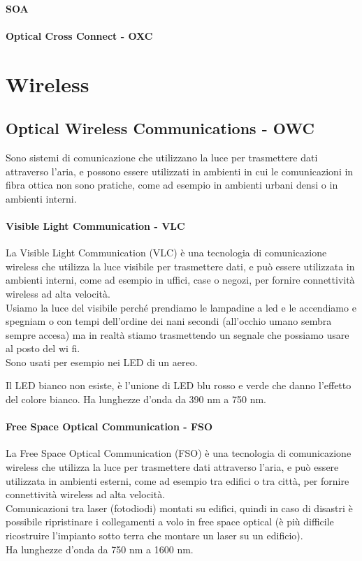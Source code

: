 \paragraph{SOA}

\paragraph{Optical Cross Connect - OXC}

\section{Wireless}
\subsection{Optical Wireless Communications - OWC}
Sono sistemi di comunicazione che utilizzano la luce per trasmettere dati attraverso l'aria, e possono essere utilizzati in ambienti in cui le comunicazioni in fibra ottica non sono pratiche, come ad esempio in ambienti urbani densi o in ambienti interni.\\

\paragraph{Visible Light Communication - VLC}
La Visible Light Communication (VLC) è una tecnologia di comunicazione wireless che utilizza la luce visibile per trasmettere dati, e può essere utilizzata in ambienti interni, come ad esempio in uffici, case o negozi, per fornire connettività wireless ad alta velocità.\\
Usiamo la luce del visibile perché prendiamo le lampadine a led e le accendiamo e spegniam o con tempi dell'ordine dei nani secondi (all'occhio umano sembra sempre accesa) ma in realtà stiamo trasmettendo un segnale che possiamo usare al posto del wi fi.\\
Sono usati per esempio nei LED di un aereo. 

Il LED bianco non esiste, è l'unione di LED blu rosso e verde che danno l'effetto del colore bianco.
Ha lunghezze d'onda da 390 nm a 750 nm.
\paragraph{Free Space Optical Communication - FSO}
La Free Space Optical Communication (FSO) è una tecnologia di comunicazione wireless che utilizza la luce per trasmettere dati attraverso l'aria, e può essere utilizzata in ambienti esterni, come ad esempio tra edifici o tra città, per fornire connettività wireless ad alta velocità.\\
Comunicazioni tra laser (fotodiodi) montati su edifici, quindi in caso di disastri è possibile ripristinare i collegamenti a volo in free space optical (è più difficile ricostruire l'impianto sotto terra che montare un laser su un edificio).\\
Ha lunghezze d'onda da 750 nm a 1600 nm.
